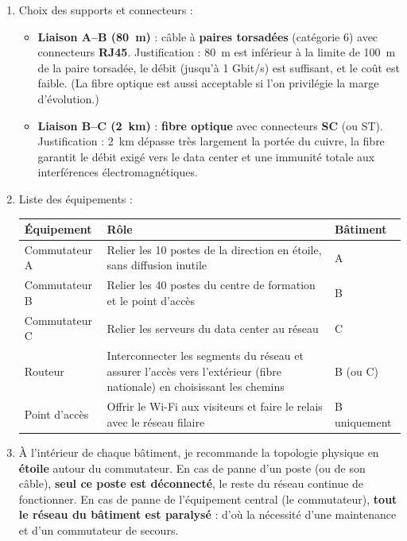 \documentclass[11pt]{article}
\newcommand{\cle}[1]{{\popxbold\color{popdark}#1}}
\begin{document}
\begin{corrige}
\begin{enumerate}
  \item Choix des supports et connecteurs :
  \begin{itemize}
    \item \textbf{Liaison A--B (\SI{80}{m})} : câble à \textbf{\cle{paires torsadées}} (catégorie 6) avec connecteurs \textbf{\cle{RJ45}}. Justification : \SI{80}{m} est inférieur à la limite de \SI{100}{m} de la paire torsadée, le débit (jusqu'à 1 Gbit/s) est suffisant, et le coût est faible. (La \cle{fibre optique} est aussi acceptable si l'on privilégie la marge d'évolution.)
    \item \textbf{Liaison B--C (\SI{2}{km})} : \textbf{\cle{fibre optique}} avec connecteurs \textbf{\cle{SC}} (ou ST). Justification : \SI{2}{km} dépasse très largement la portée du cuivre, la fibre garantit le débit exigé vers le data center et une \cle{immunité} totale aux interférences électromagnétiques.
  \end{itemize}
  \item Liste des équipements :
  \begin{center}
  \begin{tabularx}{\linewidth}{|l|X|l|}
  \hline
  \rowcolor{popblueL} \textbf{Équipement} & \textbf{Rôle} & \textbf{Bâtiment} \\
  \hline
  \cle{Commutateur} A & Relier les 10 postes de la direction en étoile, sans diffusion inutile & A \\
  \hline
  \cle{Commutateur} B & Relier les 40 postes du centre de formation et le point d'accès & B \\
  \hline
  \cle{Commutateur} C & Relier les serveurs du data center au réseau & C \\
  \hline
  \cle{Routeur} & Interconnecter les segments du réseau et assurer l'accès vers l'extérieur (fibre nationale) en choisissant les chemins & B (ou C) \\
  \hline
  \cle{Point d'accès} & Offrir le Wi-Fi aux visiteurs et faire le relais avec le réseau filaire & B uniquement \\
  \hline
  \end{tabularx}
  \end{center}
  \item À l'intérieur de chaque bâtiment, je recommande la topologie physique en \textbf{\cle{étoile}} autour du commutateur. En cas de panne d'un poste (ou de son câble), \textbf{seul ce poste est déconnecté}, le reste du réseau continue de fonctionner. En cas de panne de l'équipement central (le commutateur), \textbf{tout le réseau du bâtiment est paralysé} : d'où la nécessité d'une maintenance et d'un commutateur de secours.

\end{enumerate}
\end{corrige}
\end{document}
